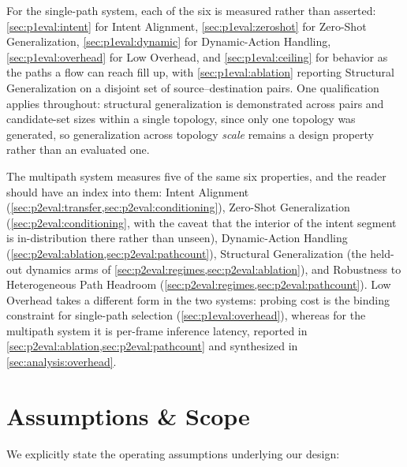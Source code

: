 For the single-path system, each of the six is measured rather than asserted:
\cref{sec:p1eval:intent} for Intent Alignment, \cref{sec:p1eval:zeroshot} for Zero-Shot Generalization,
\cref{sec:p1eval:dynamic} for Dynamic-Action Handling, \cref{sec:p1eval:overhead} for Low Overhead, and
\cref{sec:p1eval:ceiling} for behavior as the paths a flow can reach fill up, with
\cref{sec:p1eval:ablation} reporting Structural Generalization on a disjoint set of
source--destination pairs. One qualification applies throughout: structural generalization is
demonstrated across pairs and candidate-set sizes within a single topology, since only one topology was
generated, so generalization across topology \emph{scale} remains a design property rather than an
evaluated one.

The multipath system measures five of the same six properties, and the reader should have an index into
them: Intent Alignment (\cref{sec:p2eval:transfer,sec:p2eval:conditioning}), Zero-Shot Generalization
(\cref{sec:p2eval:conditioning}, with the caveat that the interior of the intent segment is
in-distribution there rather than unseen), Dynamic-Action Handling
(\cref{sec:p2eval:ablation,sec:p2eval:pathcount}), Structural Generalization (the held-out dynamics
arms of \cref{sec:p2eval:regimes,sec:p2eval:ablation}), and Robustness to Heterogeneous Path Headroom
(\cref{sec:p2eval:regimes,sec:p2eval:pathcount}). Low Overhead takes a different form in the two
systems: probing cost is the binding constraint for single-path selection
(\cref{sec:p1eval:overhead}), whereas for the multipath system it is per-frame inference latency,
reported in \cref{sec:p2eval:ablation,sec:p2eval:pathcount} and synthesized in
\cref{sec:analysis:overhead}.

\section{Assumptions \& Scope}
\label{sec:problem:assumptions}

We explicitly state the operating assumptions underlying our design:

